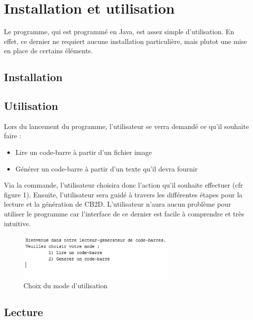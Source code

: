 \newpage
\section{Installation et utilisation}

Le programme, qui est programmé en Java, est assez simple d'utilisation. En effet, ce dernier ne requiert aucune installation particulière, mais plutot une mise en place de certains éléments. 

\subsection{Installation}

\subsection{Utilisation}

Lors du lancement du programme, l'utilisateur se verra demandé ce qu'il souhaite faire : 
\begin{itemize}
\item Lire un code-barre à partir d'un fichier image
\item Générer un code-barre à partir d'un texte qu'il devra fournir
\end{itemize}

Via la commande, l'utilisateur choisira donc l'action qu'il souhaite effectuer (cfr figure 1). Ensuite, l'utilisateur sera guidé à travers les différentes étapes pour la lecture et la génération de CB2D. L'utilisateur n'aura aucun problème pour utiliser le programme car l'interface de ce dernier est facile à comprendre et très intuitive. 

\begin{figure}[!h]
	\centering
	\includegraphics[width=0.7\textwidth]{images/choixMode.png}
	\caption{Choix du mode d'utilisation}  
	\label{Choix du mode d'utilisation}
\end{figure}



\subsection{Lecture}

